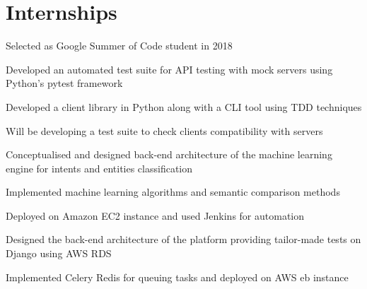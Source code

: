 \documentclass[]{deedy-resume-openfont}
\begin{document}
\begin{minipage}[t]{0.66\textwidth} 


\section{Internships}

\vspace{\topsep}
\begin{tightemize}
\item Selected as Google Summer of Code student in 2018
\item Developed an automated test suite for API testing with mock servers using Python's pytest framework
\item Developed a client library in Python along with a CLI tool using TDD techniques
\item Will be developing a test suite to check clients compatibility with servers 
\end{tightemize}
\sectionsep

\begin{tightemize}
\item Conceptualised and designed back-end architecture of the machine learning engine for intents and entities classification
\item Implemented machine learning algorithms and semantic comparison methods
\item Deployed on Amazon EC2 instance and used Jenkins for automation
\end{tightemize}

\sectionsep

\begin{tightemize}
\item Designed the back-end architecture of the platform providing tailor-made tests on Django using AWS RDS
\item Implemented Celery Redis for queuing tasks and deployed on AWS eb instance 
\end{tightemize}
\sectionsep


\end{minipage}
\end{document}
